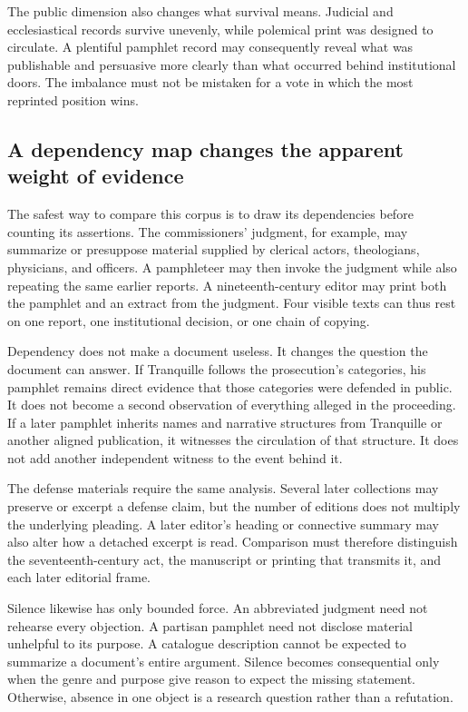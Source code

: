 The public dimension also changes what survival means.  Judicial and
ecclesiastical records survive unevenly, while polemical print was designed to
circulate.  A plentiful pamphlet record may consequently reveal what was
publishable and persuasive more clearly than what occurred behind institutional
doors.  The imbalance must not be mistaken for a vote in which the most
reprinted position wins.

\subsection{A dependency map changes the apparent weight of evidence}

The safest way to compare this corpus is to draw its dependencies before
counting its assertions.  The commissioners' judgment, for example, may
summarize or presuppose material supplied by clerical actors, theologians,
physicians, and officers.  A pamphleteer may then invoke the judgment while
also repeating the same earlier reports.  A nineteenth-century editor may
print both the pamphlet and an extract from the judgment.  Four visible texts
can thus rest on one report, one institutional decision, or one chain of
copying.

Dependency does not make a document useless.  It changes the question the
document can answer.  If Tranquille follows the prosecution's categories, his
pamphlet remains direct evidence that those categories were defended in
public.  It does not become a second observation of everything alleged in the
proceeding.  If a later pamphlet inherits names and narrative structures from
Tranquille or another aligned publication, it witnesses the circulation of
that structure.  It does not add another independent witness to the event
behind it.

The defense materials require the same analysis.  Several later collections
may preserve or excerpt a defense claim, but the number of editions does not
multiply the underlying pleading.  A later editor's heading or connective
summary may also alter how a detached excerpt is read.  Comparison must
therefore distinguish the seventeenth-century act, the manuscript or printing
that transmits it, and each later editorial frame.

Silence likewise has only bounded force.  An abbreviated judgment need not
rehearse every objection.  A partisan pamphlet need not disclose material
unhelpful to its purpose.  A catalogue description cannot be expected to
summarize a document's entire argument.  Silence becomes consequential only
when the genre and purpose give reason to expect the missing statement.
Otherwise, absence in one object is a research question rather than a
refutation.

